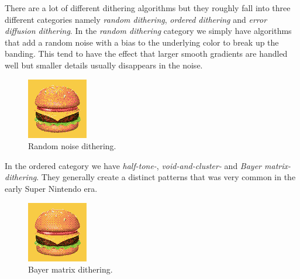 \documentclass{article}
\begin{document}
There are a lot of different dithering algorithms but they roughly fall
into three different categories namely \emph{random dithering}, \emph{ordered dithering} and
\emph{error diffusion dithering}. In the \emph{random dithering} category we simply have
algorithms that add a random noise with a bias to the underlying color
to break up the banding. This tend to have the effect that larger smooth gradients are handled well but smaller details usually disappears in the noise.

\begin{figure}[ht!]
\centering
\includegraphics{images/walkthrough/noise.png}
\caption{Random noise dithering.}
\end{figure}

In the ordered category we have \emph{half-tone-},
\emph{void-and-cluster-} and \emph{Bayer matrix-dithering}. They
generally create a distinct patterns that was very common in the early
Super Nintendo era.

\begin{figure}[ht!]
\centering
\includegraphics{images/walkthrough/bayer.png}
\caption{Bayer matrix dithering.}
\end{figure}
\end{document}
